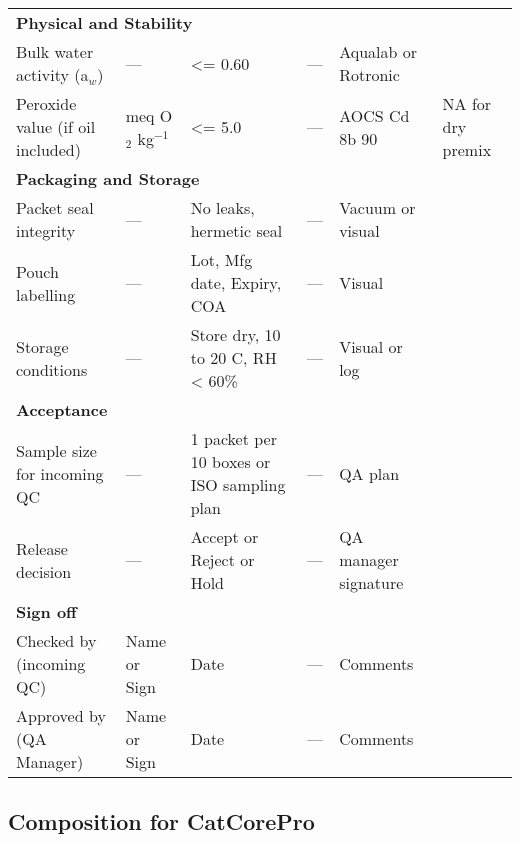 \begin{longtable}{@{}p{6.0cm}p{1.5cm}p{1.8cm}p{2.0cm}p{3.0cm}p{3.0cm}@{}}
\multicolumn{6}{l}{\textbf{Physical and Stability}} \\[3pt]
Bulk water activity (a$_w$) & --- & <= 0.60 & --- & Aqualab or Rotronic & \\[3pt]
Peroxide value (if oil included) & meq O$_2$ kg$^{-1}$ & <= 5.0 & --- & AOCS Cd 8b 90 & NA for dry premix \\[6pt]

\multicolumn{6}{l}{\textbf{Packaging and Storage}} \\[3pt]
Packet seal integrity & --- & No leaks, hermetic seal & --- & Vacuum or visual & \\[3pt]
Pouch labelling & --- & Lot, Mfg date, Expiry, COA & --- & Visual & \\[3pt]
Storage conditions & --- & Store dry, 10 to 20 C, RH < 60\% & --- & Visual or log & \\[6pt]

\multicolumn{6}{l}{\textbf{Acceptance}} \\[3pt]
Sample size for incoming QC & --- & 1 packet per 10 boxes or ISO sampling plan & --- & QA plan & \\[3pt]
Release decision & --- & Accept or Reject or Hold & --- & QA manager signature & \\[6pt]

\multicolumn{6}{l}{\textbf{Sign off}} \\[3pt]
Checked by (incoming QC) & Name or Sign & Date & --- & Comments & \\[12pt]
Approved by (QA Manager) & Name or Sign & Date & --- & Comments & \\
\bottomrule
\end{longtable}
\vspace{1em}
\vspace{1em}

\subsection*{Composition for CatCorePro}

